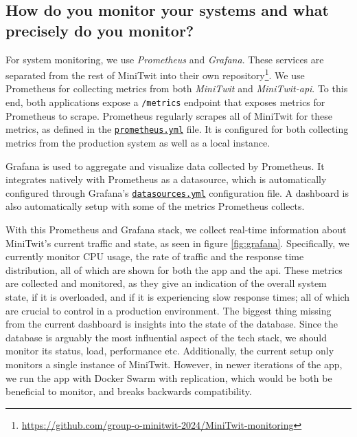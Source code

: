 \documentclass[11pt]{article}
\begin{document}
\subsection{How do you monitor your systems and what precisely do you monitor?}

For system monitoring, we use \textit{Prometheus} and \textit{Grafana}. These services are separated from the rest of MiniTwit into their own repository\footnote{\url{https://github.com/group-o-minitwit-2024/MiniTwit-monitoring}}. We use Prometheus for collecting metrics from both \textit{MiniTwit} and \textit{MiniTwit-api}. To this end, both applications expose a \texttt{/metrics} endpoint that exposes metrics for Prometheus to scrape. Prometheus regularly scrapes all of MiniTwit for these metrics, as defined in the \href{https://github.com/group-o-minitwit-2024/MiniTwit-monitoring/blob/main/prometheus/prometheus.yml}{\texttt{prometheus.yml}} file. It is configured for both collecting metrics from the production system as well as a local instance. 

Grafana is used to aggregate and visualize data collected by Prometheus. It integrates natively with Prometheus as a datasource, which is automatically configured through Grafana's \href{https://github.com/group-o-minitwit-2024/MiniTwit-monitoring/blob/main/grafana/provisioning/datasources/datasources.yaml}{\texttt{datasources.yml}} configuration file. A dashboard is also automatically setup with some of the metrics Prometheus collects. 

With this Prometheus and Grafana stack, we collect real-time information about MiniTwit's current traffic and state, as seen in figure \ref{fig:grafana}. Specifically, we currently monitor CPU usage, the rate of traffic and the response time distribution, all of which are shown for both the app and the api. These metrics are collected and monitored, as they give an indication of the overall system state, if it is overloaded, and if it is experiencing slow response times; all of which are crucial to control in a production environment. The biggest thing missing from the current dashboard is insights into the state of the database. Since the database is arguably the most influential aspect of the tech stack, we should monitor its status, load, performance etc. Additionally, the current setup only monitors a single instance of MiniTwit. However, in newer iterations of the app, we run the app with Docker Swarm with replication, which would be both be beneficial to monitor, and breaks backwards compatibility. 
\end{document}
